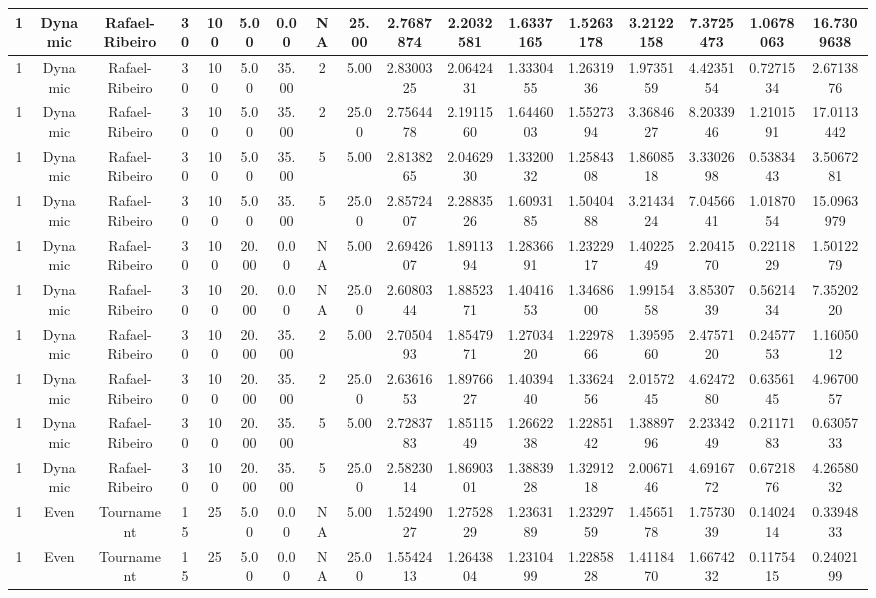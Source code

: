 \begin{longtable}{ | c | c | c | c | c | c | c | c | c | c | c | c | c | c | c | c | c | }
	\hline
	1	&	Dynamic	&	Rafael-Ribeiro	&	30	&	100	&	5.00	&	0.00	&	NA	&	25.00	&	2.7687874	&	2.2032581	&	1.6337165	&	1.5263178	&	3.2122158	&	7.3725473	&	1.0678063	&	16.7309638 \\
	\hline
	1	&	Dynamic	&	Rafael-Ribeiro	&	30	&	100	&	5.00	&	35.00	&	2	&	5.00	&	2.8300325	&	2.0642431	&	1.3330455	&	1.2631936	&	1.9735159	&	4.4235154	&	0.7271534	&	2.6713876 \\
	\hline
	1	&	Dynamic	&	Rafael-Ribeiro	&	30	&	100	&	5.00	&	35.00	&	2	&	25.00	&	2.7564478	&	2.1911560	&	1.6446003	&	1.5527394	&	3.3684627	&	8.2033946	&	1.2101591	&	17.0113442 \\
	\hline
	1	&	Dynamic	&	Rafael-Ribeiro	&	30	&	100	&	5.00	&	35.00	&	5	&	5.00	&	2.8138265	&	2.0462930	&	1.3320032	&	1.2584308	&	1.8608518	&	3.3302698	&	0.5383443	&	3.5067281 \\
	\hline
	1	&	Dynamic	&	Rafael-Ribeiro	&	30	&	100	&	5.00	&	35.00	&	5	&	25.00	&	2.8572407	&	2.2883526	&	1.6093185	&	1.5040488	&	3.2143424	&	7.0456641	&	1.0187054	&	15.0963979 \\
	\hline
	1	&	Dynamic	&	Rafael-Ribeiro	&	30	&	100	&	20.00	&	0.00	&	NA	&	5.00	&	2.6942607	&	1.8911394	&	1.2836691	&	1.2322917	&	1.4022549	&	2.2041570	&	0.2211829	&	1.5012279 \\
	\hline
	1	&	Dynamic	&	Rafael-Ribeiro	&	30	&	100	&	20.00	&	0.00	&	NA	&	25.00	&	2.6080344	&	1.8852371	&	1.4041653	&	1.3468600	&	1.9915458	&	3.8530739	&	0.5621434	&	7.3520220 \\
	\hline
	1	&	Dynamic	&	Rafael-Ribeiro	&	30	&	100	&	20.00	&	35.00	&	2	&	5.00	&	2.7050493	&	1.8547971	&	1.2703420	&	1.2297866	&	1.3959560	&	2.4757120	&	0.2457753	&	1.1605012 \\
	\hline
	1	&	Dynamic	&	Rafael-Ribeiro	&	30	&	100	&	20.00	&	35.00	&	2	&	25.00	&	2.6361653	&	1.8976627	&	1.4039440	&	1.3362456	&	2.0157245	&	4.6247280	&	0.6356145	&	4.9670057 \\
	\hline
	1	&	Dynamic	&	Rafael-Ribeiro	&	30	&	100	&	20.00	&	35.00	&	5	&	5.00	&	2.7283783	&	1.8511549	&	1.2662238	&	1.2285142	&	1.3889796	&	2.2334249	&	0.2117183	&	0.6305733 \\
	\hline
	1	&	Dynamic	&	Rafael-Ribeiro	&	30	&	100	&	20.00	&	35.00	&	5	&	25.00	&	2.5823014	&	1.8690301	&	1.3883928	&	1.3291218	&	2.0067146	&	4.6916772	&	0.6721876	&	4.2658032 \\
	\hline
	1	&	Even	&	Tournament	&	15	&	25	&	5.00	&	0.00	&	NA	&	5.00	&	1.5249027	&	1.2752829	&	1.2363189	&	1.2329759	&	1.4565178	&	1.7573039	&	0.1402414	&	0.3394833 \\
	\hline
	1	&	Even	&	Tournament	&	15	&	25	&	5.00	&	0.00	&	NA	&	25.00	&	1.5542413	&	1.2643804	&	1.2310499	&	1.2285828	&	1.4118470	&	1.6674232	&	0.1175415	&	0.2402199 \\

\end{longtable}
